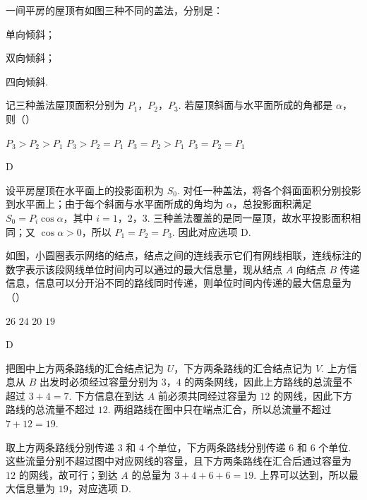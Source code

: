 \begin{problem}
一间平房的屋顶有如图三种不同的盖法，分别是：

\begin{circlelist}
\item 单向倾斜；
\item 双向倾斜；
\item 四向倾斜.
\end{circlelist}

记三种盖法屋顶面积分别为 \(P_{1}\)，\(P_{2}\)，\(P_{3}\). 若屋顶斜面与水平面所成的角都是 \(\alpha\)，则（\quad）

\problemresetlayout
{}

\choices
    {\(P_{3} > P_{2} > P_{1}\)}
    {\(P_{3} > P_{2} = P_{1}\)}
    {\(P_{3} = P_{2} > P_{1}\)}
    {\(P_{3} = P_{2} = P_{1}\)}
\end{problem}

\begin{answer}
D
\end{answer}

\begin{solution}
设平房屋顶在水平面上的投影面积为 \(S_0\). 对任一种盖法，将各个斜面面积分别投影到水平面上；由于每个斜面与水平面所成的角均为 \(\alpha\)，总投影面积满足
\(S_0=P_i\cos\alpha\)，其中 \(i=1\)，\(2\)，\(3\). 三种盖法覆盖的是同一屋顶，故水平投影面积相同；又 \(\cos\alpha>0\)，所以 \(P_1=P_2=P_3\). 因此对应选项 D.
\end{solution}

\begin{problem}
如图，小圆圈表示网络的结点，结点之间的连线表示它们有网线相联，连线标注的数字表示该段网线单位时间内可以通过的最大信息量，现从结点 \(A\) 向结点 \(B\) 传递信息，信息可以分开沿不同的路线同时传递，则单位时间内传递的最大信息量为（\quad）


\choices
    {\(26\)}
    {\(24\)}
    {\(20\)}
    {\(19\)}
\end{problem}

\begin{answer}
D
\end{answer}

\begin{solution}
把图中上方两条路线的汇合结点记为 \(U\)，下方两条路线的汇合结点记为 \(V\). 上方信息从 \(B\) 出发时必须经过容量分别为 \(3\)，\(4\) 的两条网线，因此上方路线的总流量不超过 \(3+4=7\). 下方信息在到达 \(A\) 前必须共同经过容量为 \(12\) 的网线，因此下方路线的总流量不超过 \(12\). 两组路线在图中只在端点汇合，所以总流量不超过 \(7+12=19\).

取上方两条路线分别传递 \(3\) 和 \(4\) 个单位，下方两条路线分别传递 \(6\) 和 \(6\) 个单位. 这些流量分别不超过图中对应网线的容量，且下方两条路线在汇合后通过容量为 \(12\) 的网线，故可行；到达 \(A\) 的总量为 \(3+4+6+6=19\). 上界可以达到，所以最大信息量为 \(19\)，对应选项 D.
\end{solution}

